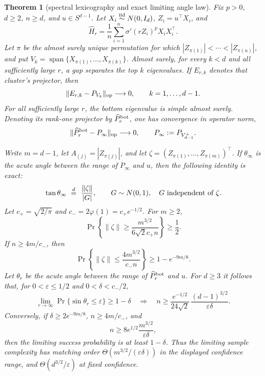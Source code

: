 \documentclass[11pt]{article}
\newtheorem{theorem}{Theorem}[section]
\begin{document}
\begin{theorem}[spectral lexicography and exact limiting angle law]
\label{thm:spectrallexicography}
Fix $p>0$, $d\ge2$, $n\ge d$, and $u\in S^{d-1}$.  Let $X_i\stackrel{\rm iid}{\sim}N(0,I_d)$,
$Z_i=u^\top X_i$, and
\[
 \widehat H_r=\frac1n\sum_{i=1}^n\sigma'(rZ_i)^pX_iX_i^\top.
\]
Let $\pi$ be the almost surely unique permutation for which
$|Z_{\pi(1)}|<\cdots<|Z_{\pi(n)}|$, and put
$V_k=\operatorname{span}\{X_{\pi(1)},\ldots,X_{\pi(k)}\}$.  Almost surely, for every $k<d$ and all sufficiently
large $r$, a gap separates the top $k$ eigenvalues.  If $E_{r,k}$ denotes that cluster's projector, then
\begin{equation}
 \lVert E_{r,k}-P_{V_k}\rVert_{\rm op}\longrightarrow0,
 \qquad k=1,\ldots,d-1.
 \label{eq:spectralflag}
\end{equation}
For all sufficiently large $r$, the bottom eigenvalue is simple almost surely.  Denoting its rank-one projector by
$\widehat P_r^{\rm bot}$, one has convergence in operator norm,
\begin{equation}
 \lVert\widehat P_r^{\rm bot}-P_\infty\rVert_{\rm op}\longrightarrow0,
 \qquad P_\infty:=P_{V_{d-1}^{\perp}}.
 \label{eq:bottomlimit}
\end{equation}

Write $m=d-1$, let $A_{(j)}=|Z_{\pi(j)}|$, and let
$\zeta=(Z_{\pi(1)},\ldots,Z_{\pi(m)})^\top$.  If $\theta_\infty$ is the acute angle between the range of
$P_\infty$ and $u$, then the following identity is exact:
\begin{equation}
 \tan\theta_\infty\ \stackrel{d}=\ \frac{\lVert\zeta\rVert}{|G|},
 \qquad G\sim N(0,1),\quad G\ \hbox{independent of }\zeta.
 \label{eq:exactanglelaw}
\end{equation}
Let $c_+=\sqrt{2/\pi}$ and $c_-=2\varphi(1)=c_+e^{-1/2}$.  For $m\ge2$,
\begin{equation}
 \Pr\!\left\{\lVert\zeta\rVert\ge
 \frac{m^{3/2}}{6\sqrt2c_+n}\right\}\ge\frac12.
 \label{eq:orderlower}
\end{equation}
If $n\ge4m/c_-$, then
\begin{equation}
 \Pr\!\left\{\lVert\zeta\rVert\le
 \frac{4m^{3/2}}{c_-n}\right\}\ge1-e^{-9m/8}.
 \label{eq:orderupper}
\end{equation}
Let $\theta_r$ be the acute angle between the range of $\widehat P_r^{\rm bot}$ and $u$.  For $d\ge3$ it follows
that, for $0<\varepsilon\le1/2$ and $0<\delta<c_-/2$,
\begin{equation}
 \lim_{r\to\infty}\Pr\{\sin\theta_r\le\varepsilon\}\ge1-\delta
 \quad\Longrightarrow\quad
 n\ge\frac{e^{-1/2}}{24\sqrt2}\,
 \frac{(d-1)^{3/2}}{\varepsilon\delta}.
 \label{eq:anglelowercomplexity}
\end{equation}
Conversely, if $\delta\ge2e^{-9m/8}$, $n\ge4m/c_-$, and
\begin{equation}
 n\ge8e^{1/2}\frac{m^{3/2}}{\varepsilon\delta},
 \label{eq:angleuppercomplexity}
\end{equation}
then the limiting success probability is at least $1-\delta$.  Thus the limiting sample complexity has matching
order $\Theta(m^{3/2}/(\varepsilon\delta))$ in the displayed confidence range, and
$\Theta(d^{3/2}/\varepsilon)$ at fixed confidence.
\end{theorem}
\end{document}

